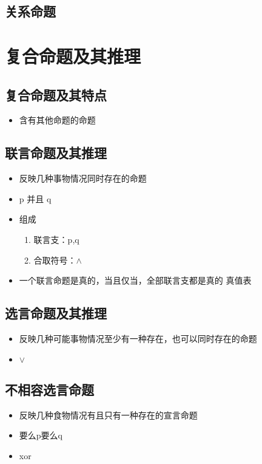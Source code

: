 \documentclass[11pt]{article}
\begin{document}
\subsection{关系命题}
\label{sec-4-4}
\section{复合命题及其推理}
\label{sec-5}
\subsection{复合命题及其特点}
\label{sec-5-1}
\begin{itemize}
\item 含有其他命题的命题
\end{itemize}
\subsection{联言命题及其推理}
\label{sec-5-2}
\begin{itemize}
\item 反映几种事物情况同时存在的命题
\item p 并且 q
\item 组成
\begin{enumerate}
\item 联言支：p,q
\item 合取符号：$\wedge$
\end{enumerate}
\item 一个联言命题是真的，当且仅当，全部联言支都是真的
真值表
\end{itemize}
\subsection{选言命题及其推理}
\label{sec-5-3}
\begin{itemize}
\item 反映几种可能事物情况至少有一种存在，也可以同时存在的命题
\item $\vee$
\end{itemize}
\subsection{不相容选言命题}
\label{sec-5-4}
\begin{itemize}
\item 反映几种食物情况有且只有一种存在的宣言命题
\item 要么p要么q
\item xor
\end{itemize}
\end{document}
